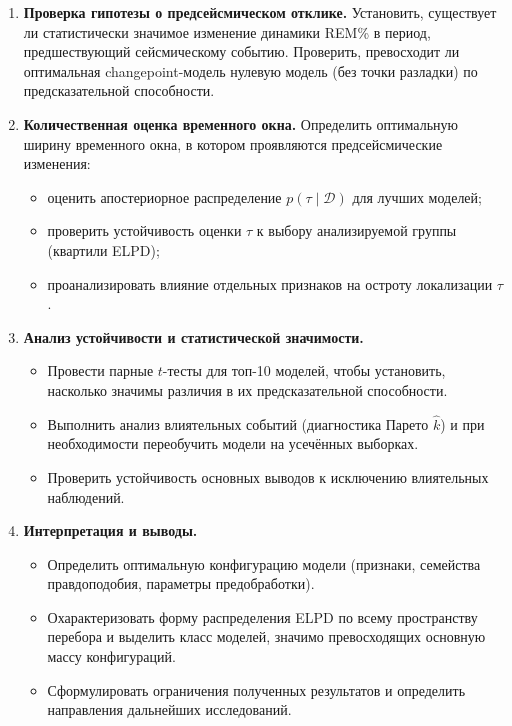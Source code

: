 \documentclass[14pt]{mmcs_article}
\begin{document}
\begin{enumerate}
	\item \textbf{Проверка гипотезы о предсейсмическом
		отклике.}
	Установить, существует ли статистически значимое
	изменение динамики REM\% в период,
	предшествующий сейсмическому событию. Проверить,
	превосходит ли оптимальная changepoint-модель
	нулевую модель (без точки разладки) по
	предсказательной способности.
	
	\item \textbf{Количественная оценка временного окна.}
	Определить оптимальную ширину временного окна, в
	котором проявляются предсейсмические изменения:
	\begin{itemize}
		\item оценить апостериорное распределение
		$p(\tau \mid \mathcal{D})$ для лучших
		моделей;
		\item проверить устойчивость оценки $\tau$ к
		выбору анализируемой группы (квартили
		ELPD);
		\item проанализировать влияние отдельных
		признаков на остроту локализации
		$\tau$.
	\end{itemize}
	
	\item \textbf{Анализ устойчивости и статистической
		значимости.}
	\begin{itemize}
		\item Провести парные $t$-тесты для топ-10
		моделей, чтобы установить, насколько
		значимы различия в их предсказательной
		способности.
		\item Выполнить анализ влиятельных событий
		(диагностика Парето $\hat{k}$) и при
		необходимости переобучить модели на
		усечённых выборках.
		\item Проверить устойчивость основных выводов
		к исключению влиятельных наблюдений.
	\end{itemize}
	
	\item \textbf{Интерпретация и выводы.}
	\begin{itemize}
		\item Определить оптимальную конфигурацию
		модели (признаки, семейства
		правдоподобия, параметры
		предобработки).
		\item Охарактеризовать форму распределения
		ELPD по всему пространству перебора и
		выделить класс моделей, значимо
		превосходящих основную массу
		конфигураций.
		\item Сформулировать ограничения полученных
		результатов и определить направления
		дальнейших исследований.
	\end{itemize}
\end{enumerate}
\end{document}

